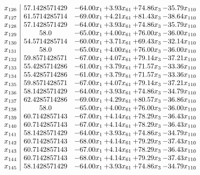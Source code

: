 \documentclass[8pt]{article}
\begin{document}
\[\begin{array}{c| c c@{\hskip 2pt} c@{\hskip 2pt} c@{\hskip 2pt} c@{\hskip 2pt} }
 x_{126}   &  57.1428571429 & -64.00 x_{1} & +  3.93 x_{61} & + 74.86 x_{3} & -35.79 x_{110}\\
 x_{127}   &  61.5714285714 & -69.00 x_{1} & +  4.21 x_{61} & + 81.43 x_{3} & -38.64 x_{110}\\
 x_{128}   &  57.1428571429 & -64.00 x_{1} & +  3.93 x_{61} & + 74.86 x_{3} & -35.79 x_{110}\\
 x_{129}   &  58.0 & -65.00 x_{1} & +  4.00 x_{61} & + 76.00 x_{3} & -36.00 x_{110}\\
 x_{130}   &  54.5714285714 & -60.00 x_{1} & +  3.71 x_{61} & + 69.43 x_{3} & -32.14 x_{110}\\
 x_{131}   &  58.0 & -65.00 x_{1} & +  4.00 x_{61} & + 76.00 x_{3} & -36.00 x_{110}\\
 x_{132}   &  59.8571428571 & -67.00 x_{1} & +  4.07 x_{61} & + 79.14 x_{3} & -37.21 x_{110}\\
 x_{133}   &  55.4285714286 & -61.00 x_{1} & +  3.79 x_{61} & + 71.57 x_{3} & -33.36 x_{110}\\
 x_{134}   &  55.4285714286 & -61.00 x_{1} & +  3.79 x_{61} & + 71.57 x_{3} & -33.36 x_{110}\\
 x_{135}   &  59.8571428571 & -67.00 x_{1} & +  4.07 x_{61} & + 79.14 x_{3} & -37.21 x_{110}\\
 x_{136}   &  58.1428571429 & -64.00 x_{1} & +  3.93 x_{61} & + 74.86 x_{3} & -34.79 x_{110}\\
 x_{137}   &  62.4285714286 & -69.00 x_{1} & +  4.29 x_{61} & + 80.57 x_{3} & -36.86 x_{110}\\
 x_{138}   &  58.0 & -65.00 x_{1} & +  4.00 x_{61} & + 76.00 x_{3} & -36.00 x_{110}\\
 x_{139}   &  60.7142857143 & -67.00 x_{1} & +  4.14 x_{61} & + 78.29 x_{3} & -36.43 x_{110}\\
 x_{140}   &  60.7142857143 & -67.00 x_{1} & +  4.14 x_{61} & + 78.29 x_{3} & -36.43 x_{110}\\
 x_{141}   &  58.1428571429 & -64.00 x_{1} & +  3.93 x_{61} & + 74.86 x_{3} & -34.79 x_{110}\\
 x_{142}   &  60.7142857143 & -68.00 x_{1} & +  4.14 x_{61} & + 79.29 x_{3} & -37.43 x_{110}\\
 x_{143}   &  60.7142857143 & -67.00 x_{1} & +  4.14 x_{61} & + 78.29 x_{3} & -36.43 x_{110}\\
 x_{144}   &  60.7142857143 & -68.00 x_{1} & +  4.14 x_{61} & + 79.29 x_{3} & -37.43 x_{110}\\
 x_{145}   &  58.1428571429 & -64.00 x_{1} & +  3.93 x_{61} & + 74.86 x_{3} & -34.79 x_{110}\\

\end{array}\]
\end{document}

